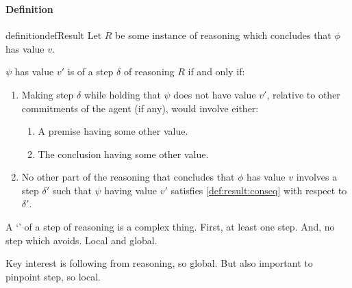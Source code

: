 \subsubsection{}
\label{sec:def-of-result}

\paragraph{Definition}

\begin{note}
  \begin{restatable}{definition}{defResult}
    \label{def:result}
    Let \(R\) be some instance of reasoning which concludes that \(\phi\) has value \(v\).

    \(\psi\) has value \(v'\) is \emph{\result{}} of a step \(\delta\) of reasoning \(R\) if and only if:
    \begin{enumerate}[label=\arabic*., ref=\named{P:\arabic*}]
    \item
      \label{def:result:conseq}
      Making step \(\delta\) while holding that \(\psi\) does not have value \(v'\), relative to other commitments of the agent (if any), would involve either:
      \begin{enumerate}[label=\alph*., ref=\named{P:2\alph*}]
      \item
        \label{def:result:conseq:a}
        A premise having some other value.
      \item
        \label{def:result:conseq:c}
        The conclusion having some other value.
      \end{enumerate}
    \item
      \label{def:requ:persists}
      No other part of the reasoning that concludes that \(\phi\) has value \(v\) involves a step \(\delta'\) such that \(\psi\) having value \(v'\) satisfies \ref{def:result:conseq} with respect to \(\delta'\).
    \end{enumerate}
    \vspace{-\baselineskip}
  \end{restatable}
\end{note}

\begin{note}
  A `\result{}' of a step of reasoning is a complex thing.
  First, at least one step.
  And, no step which avoids.
  Local and global.

  Key interest is following from reasoning, so global.
  But also important to pinpoint step, so local.
\end{note}

